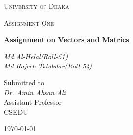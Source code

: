 \documentclass[12pt,a4paper]{report}
\begin{document}
\begin{titlepage}
\centering
{\scshape\LARGE University of Dhaka \par}
\vspace{1cm}
{\scshape\Large Assignment One\par}
\vspace{1.5cm}
{\huge\bfseries Assignment on Vectors and Matrics\par}
\vspace{2cm}
{\Large\itshape Md.Al-Helal(Roll-51)\\Md.Rajeeb Talukdar(Roll-54)\par}
\vfill
Submitted to\\
\vspace{0.5cm}
\textit{Dr. Amin Ahsan Ali} \\ Assistant Professor\\CSEDU
\vfill
{\large \today\par}
\end{titlepage}
\end{document}
